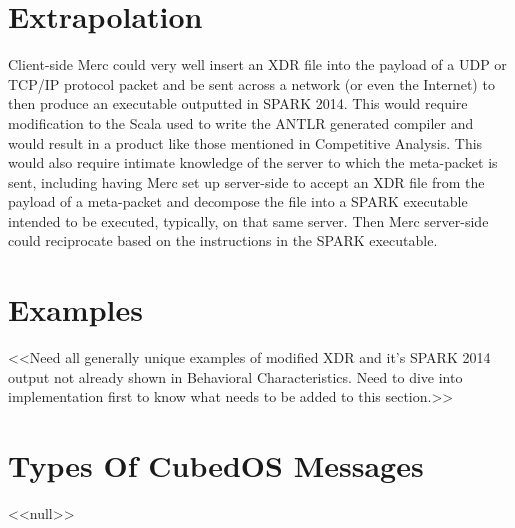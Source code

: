 \section{Extrapolation}

Client-side Merc could very well insert an XDR file into the payload of a UDP or TCP/IP
protocol packet and be sent across a network (or even the Internet) to then produce an
executable outputted in SPARK 2014. This would require modification to the Scala used to write
the ANTLR generated compiler and would result in a product like those mentioned in Competitive
Analysis. This would also require intimate knowledge of the server to which the meta-packet is
sent, including having Merc set up server-side to accept an XDR file from the payload of a
meta-packet and decompose the file into a SPARK executable intended to be executed, typically,
on that same server. Then Merc server-side could reciprocate based on the instructions in the
SPARK executable.

\section{Examples}

<<Need all generally unique examples of modified XDR and it’s SPARK 2014 output not already
shown in Behavioral Characteristics. Need to dive into implementation first to know what needs
to be added to this section.>>

\section{Types Of CubedOS Messages}

<<null>>
